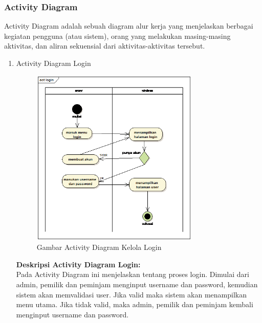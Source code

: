 \subsubsection{Activity Diagram}
Activity Diagram adalah sebuah diagram alur kerja yang menjelaskan berbagai kegiatan pengguna (atau sistem), orang yang melakukan masing-masing aktivitas, dan aliran sekuensial dari aktivitas-aktivitas tersebut.
\begin{enumerate}

\item Activity Diagram Login
\hfill\\
	\begin{figure}[H]
		\includegraphics[width=8cm]{figures/analisis/11.png}
		\centering
		\caption{Gambar Activity Diagram Kelola Login}
	\end{figure}
\textbf{Deskripsi Activity Diagram Login:}
\hfill\\
Pada Activity Diagram ini menjelaskan tentang proses login. Dimulai dari admin, pemilik dan peminjam menginput username dan password, kemudian sistem akan memvalidasi user. Jika valid maka sistem akan menampilkan menu utama. Jika tidak valid, maka admin, pemilik dan peminjam kembali menginput username dan password.	
	

\end{enumerate}
